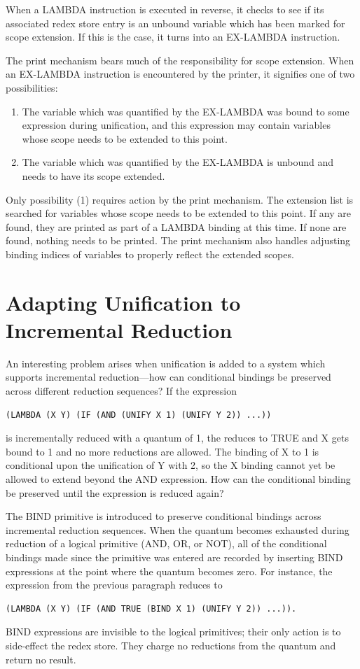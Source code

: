 When a LAMBDA instruction is executed in reverse, it checks to see if its
associated redex store entry is an unbound variable which has been marked for
scope extension. If this is the case, it turns into an EX-LAMBDA instruction.

The print mechanism bears much of the responsibility for scope extension. When
an EX-LAMBDA instruction is encountered by the printer, it signifies one of two
possibilities:

\begin{enumerate}
\item The variable which was quantified by the EX-LAMBDA was bound to some
expression during unification, and this expression may contain variables whose
scope needs to be extended to this point.
\item The variable which was quantified by the EX-LAMBDA is unbound and needs to
have its scope extended.
\end{enumerate}

Only possibility (1) requires action by the print mechanism. The extension list
is searched for variables whose scope needs to be extended to this point. If any
are found, they are printed as part of a LAMBDA binding at this time. If none
are found, nothing needs to be printed. The print mechanism also handles
adjusting binding indices of variables to properly reflect the extended scopes.

\section{Adapting Unification to Incremental Reduction}

An interesting problem arises when unification is added to a system which
supports incremental reduction---how can conditional bindings be preserved
across different reduction sequences? If the expression
\begin{verbatim}
(LAMBDA (X Y) (IF (AND (UNIFY X 1) (UNIFY Y 2)) ...))
\end{verbatim}
is incrementally reduced with a quantum of 1, the  reduces to
TRUE and X gets bound to 1 and no more reductions are allowed. The binding of X
to 1 is conditional upon the unification of Y with 2, so the X binding cannot
yet be allowed to extend beyond the AND expression. How can the conditional
binding be preserved until the expression is reduced again?

The BIND primitive is introduced to preserve conditional bindings across
incremental reduction sequences. When the quantum becomes exhausted during
reduction of a logical primitive (AND, OR, or NOT), all of the conditional
bindings made since the primitive was entered are recorded by inserting BIND
expressions at the point where the quantum becomes zero. For instance, the
expression from the previous paragraph reduces to
\begin{verbatim}
(LAMBDA (X Y) (IF (AND TRUE (BIND X 1) (UNIFY Y 2)) ...)).
\end{verbatim}
BIND expressions are invisible to the logical primitives; their only action is
to side-effect the redex store. They charge no reductions from the quantum and
return no result.

